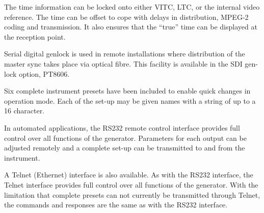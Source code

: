 The time information can be locked onto either VITC, LTC, or the internal video reference. The time can be offset to cope with delays in distribution, MPEG-2 coding and transmission. It also ensures that the ``true'' time can be displayed at the reception point.

Serial digital genlock is used in remote installations where distribution of the master sync takes place via optical fibre. This facility is available in the SDI gen-lock option, PT8606.

Six complete instrument presets have been included to enable quick changes in operation mode. Each of the set-up may be given names with a string of up to a 16 character.

In automated applications, the RS232 remote control interface provides full control over all functions of the generator. Parameters for each output can be adjusted remotely and a complete set-up can be transmitted to and from the instrument.

A Telnet (Ethernet) interface is also available. As with the RS232 interface, the Telnet interface provides full control over all functions of the generator. With the limitation that complete presets can not currently be transmitted through Telnet, the commands and responses are the same as with the RS232 interface.
